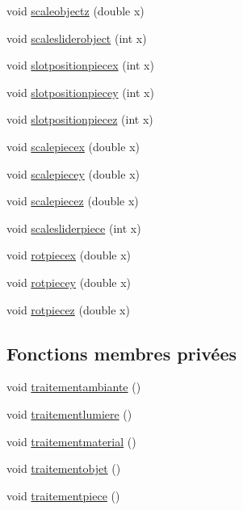 \begin{DoxyCompactItemize}
void \hyperlink{class_mondock_a1f5430731565a79314d90de605741e75}{scaleobjectz} (double x)
\item 
void \hyperlink{class_mondock_a0b0dfd777e3a4ee9f4ac65ab44b02fca}{scalesliderobject} (int x)
\item 
void \hyperlink{class_mondock_aab1b5fe42325904c90cb7ea01d20dda3}{slotpositionpiecex} (int x)
\item 
void \hyperlink{class_mondock_aa9b2f07da91515f13c0dc217d24357ba}{slotpositionpiecey} (int x)
\item 
void \hyperlink{class_mondock_a655881c708869d768f1488d6fa066dc6}{slotpositionpiecez} (int x)
\item 
void \hyperlink{class_mondock_a9f2a071406501e4fccde215bc38d8df9}{scalepiecex} (double x)
\item 
void \hyperlink{class_mondock_a4ac3bc0b53096e41379ac7ef64de9d2d}{scalepiecey} (double x)
\item 
void \hyperlink{class_mondock_afd3ea421e6df4deac7930ed476556aa4}{scalepiecez} (double x)
\item 
void \hyperlink{class_mondock_aa2174033ee4e3798b0c800a2c92f958f}{scalesliderpiece} (int x)
\item 
void \hyperlink{class_mondock_a124312bbc80f593e1868bf0219cf0056}{rotpiecex} (double x)
\item 
void \hyperlink{class_mondock_a2e657947e69adddb4ee8527063377a31}{rotpiecey} (double x)
\item 
void \hyperlink{class_mondock_a8f94fe729819688c88de6025642463c9}{rotpiecez} (double x)
\end{DoxyCompactItemize}
\subsection*{Fonctions membres privées}
\begin{DoxyCompactItemize}
\item 
void \hyperlink{class_mondock_ae228ac3c0273c3f275fb88842d9c8899}{traitementambiante} ()
\item 
void \hyperlink{class_mondock_aea9fc6ea30f9958ac3a747552ecbed17}{traitementlumiere} ()
\item 
void \hyperlink{class_mondock_ab482a04624f22351da70e316fe9c8d4e}{traitementmaterial} ()
\item 
void \hyperlink{class_mondock_aad20b3c5334d00fe5e69ac5872f76f4b}{traitementobjet} ()
\item 
void \hyperlink{class_mondock_a8f0d8c5f390853f482b38bbcf943447a}{traitementpiece} ()
\end{DoxyCompactItemize}
